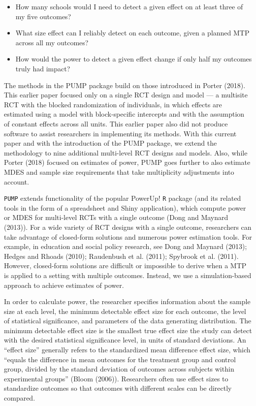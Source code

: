 \documentclass{article}
\providecommand{\tightlist}{%
  \setlength{\itemsep}{0pt}\setlength{\parskip}{0pt}}
\begin{document}
\begin{itemize}
\tightlist
\item
  How many schools would I need to detect a given effect on at least
  three of my five outcomes?
\item
  What size effect can I reliably detect on each outcome, given a
  planned MTP across all my outcomes?
\item
  How would the power to detect a given effect change if only half my
  outcomes truly had impact?
\end{itemize}

The methods in the PUMP package build on those introduced in Porter
(2018). This earlier paper focused only on a single RCT design and model
--- a multisite RCT with the blocked randomization of individuals, in
which effects are estimated using a model with block-specific intercepts
and with the assumption of constant effects across all units. This
earlier paper also did not produce software to assist researchers in
implementing its methods. With this current paper and with the
introduction of the PUMP package, we extend the methodology to nine
additional multi-level RCT designs and models. Also, while Porter (2018)
focused on estimates of power, PUMP goes further to also estimate MDES
and sample size requirements that take multiplicity adjustments into
account.

\texttt{PUMP} extends functionality of the popular PowerUp! \texttt{R}
package (and its related tools in the form of a spreadsheet and Shiny
application), which compute power or MDES for multi-level RCTs with a
single outcome (Dong and Maynard (2013)). For a wide variety of RCT
designs with a single outcome, researchers can take advantage of
closed-form solutions and numerous power estimation tools. For example,
in education and social policy research, see Dong and Maynard (2013);
Hedges and Rhoads (2010); Raudenbush et al. (2011); Spybrook et al.
(2011). However, closed-form solutions are difficult or impossible to
derive when a MTP is applied to a setting with multiple outcomes.
Instead, we use a simulation-based approach to achieve estimates of
power.

In order to calculate power, the researcher specifies information about
the sample size at each level, the minimum detectable effect size for
each outcome, the level of statistical significance, and parameters of
the data generating distribution. The minimum detectable effect size is
the smallest true effect size the study can detect with the desired
statistical significance level, in units of standard deviations. An
``effect size'' generally refers to the standardized mean difference
effect size, which ``equals the difference in mean outcomes for the
treatment group and control group, divided by the standard deviation of
outcomes across subjects within experimental groups'' (Bloom (2006)).
Researchers often use effect sizes to standardize outcomes so that
outcomes with different scales can be directly compared.
\end{document}
